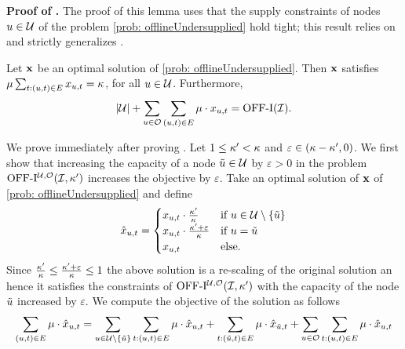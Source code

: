 { \noindent \textbf{Proof of .} The proof of this lemma uses that the supply constraints of nodes $u \in \mathcal {\mathcal U}$ of the problem \ref{prob: offlineUndersupplied} hold tight; {this result relies on and strictly generalizes .}
\begin{lemma}
    \label{claim: tightnessInU}
    Let $\mathbf{x}$ be an optimal solution of \ref{prob: offlineUndersupplied}. Then $\mathbf{x}$ satisfies $\mu \sum_{t: (u,t) \in E} x_{u,t} = \kappa$, for all $u \in \mathcal U$. Furthermore,
    \begin{equation*}
        \label{eq: tightnessInU}
        |\mathcal U| + \sum_{u \in \mathcal O} \sum_{(u,t) \in E} \mu \cdot x_{u,t} = \mathrm{\mathrm{OFF}}\textrm{-}\mathrm{I}(\mathcal I).
    \end{equation*}
\end{lemma}
We prove  immediately after proving .
Let $1 \leq \kappa' < \kappa$ and $\varepsilon \in (\kappa - \kappa', 0)$. We {first show that increasing the capacity of a node $\Tilde{u} \in \mathcal U$ by $\varepsilon>0$ in the problem $\mathrm{\mathrm{OFF}}\textrm{-}\mathrm{I}^{\mathcal U, \mathcal O}(\mathcal I, \kappa')$ increases the objective by $\varepsilon$}.
Take an optimal solution of $\mathbf{x}$ of \ref{prob: offlineUndersupplied} and define
    \begin{equation*}
        \hat{x}_{u,t} = \begin{cases}
            x_{u,t} \cdot \frac{\kappa'}{\kappa} & \text{if $u \in \mathcal U \setminus \{\Tilde{u}\}$}\\
            x_{u,t} \cdot \frac{\kappa' + \varepsilon}{\kappa} & \text{if $u  = \Tilde{u}$}\\
            x_{u,t} & \text{else.}\\
        \end{cases}
    \end{equation*}
    Since $\frac{\kappa'}{\kappa} \leq \frac{\kappa' + \varepsilon}{\kappa} \leq 1$ the above solution is a re-scaling of the original solution an hence it satisfies the constraints of $\mathrm{\mathrm{OFF}}\textrm{-}\mathrm{I}^{\mathcal U, \mathcal O}(\mathcal I, \kappa')$ with the capacity of the node $\Tilde{u}$ increased by $\varepsilon$. We compute the objective of the solution as follows
    \begin{align*}
        \sum_{(u, t) \in E}{ \prob \cdot \hat{x}_{u, t}} &= \sum_{u \in \undersup \setminus \{\Tilde{u}\}} \sum_{t: (u, t) \in E}{ \prob \cdot \hat{x}_{u, t}} + \sum_{t: (\Tilde{u}, t) \in E} \prob \cdot \hat{x}_{\Tilde{u}, t} + \sum_{u \in \mathcal O} \sum_{t: (u, t) \in E}{ \prob \cdot \hat{x}_{u, t}}\\

\end{align*}}
